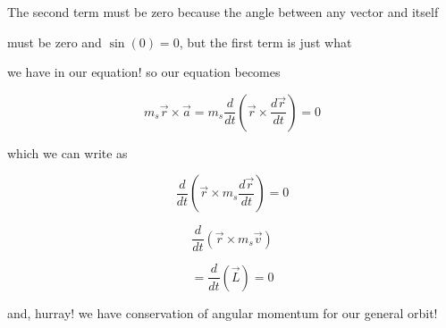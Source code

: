 The second term must be zero because the angle between any vector and itself

must be zero and $\sin \left( 0\right) =0$, but the first term is just what

we have in our equation! so our equation becomes%

$$m_{s}\overrightarrow{r}\times \overrightarrow{a}=m_{s}\frac{d}{dt}\left( \overrightarrow{r}\times \frac{d\overrightarrow{r}}{dt}\right) =0$$

which we can write as%

$$\frac{d}{dt}\left( \overrightarrow{r}\times m_{s}\frac{d\overrightarrow{r}}{dt}\right) =0$$

$$\frac{d}{dt}\left( \overrightarrow{r}\times m_{s}\overrightarrow{v}\right) $$



$$=\frac{d}{dt}\left( \overrightarrow{L}\right) =0$$

and, hurray! we have conservation of angular momentum for our general orbit!


